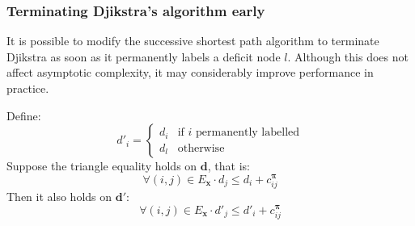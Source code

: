 \subsubsection{Terminating Djikstra's algorithm early}

It is possible to modify the successive shortest path algorithm to terminate Djikstra as soon as it permanently labels a deficit node $l$. Although this does not affect asymptotic complexity, it may considerably improve performance in practice.\\

\begin{lemma} \label{lemma:ssp-preserve-triangle}
    Define:
    \[
    d'_{i}=\begin{cases}
    d_{i} & \text{if $i$ permanently labelled}\\
    d_{l} & \text{otherwise}
    \end{cases}
    \]
    Suppose the triangle equality holds on $\mathbf{d}$, that is:
    \begin{equation} \label{eq:djikstra-triangle-assumption}
    \forall(i,j)\in E_{\mathbf{x}}\cdot d_j \leq d_i + c^{\boldsymbol{\pi}}_{ij}
    \end{equation}
    Then it also holds on $\mathbf{d}'$:
    \[\forall(i,j)\in E_{\mathbf{x}}\cdot d'_j \leq d'_i + c^{\boldsymbol{\pi}}_{ij}\]
\end{lemma}
